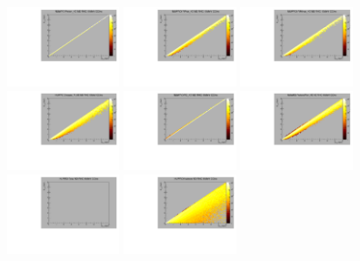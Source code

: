 \begin{center}

  \includegraphics[width=0.245\textwidth]{plots/response_matrix/Proton_KE_RHC_CCInc_10MeV.pdf}
  \includegraphics[width=0.245\textwidth]{plots/response_matrix/PiPlus_KE_RHC_CCInc_10MeV.pdf}
  \includegraphics[width=0.245\textwidth]{plots/response_matrix/PiMinus_KE_RHC_CCInc_10MeV.pdf}
  \includegraphics[width=0.245\textwidth]{plots/response_matrix/Charged_Pi_KE_RHC_CCInc_10MeV.pdf}
  \includegraphics[width=0.245\textwidth]{plots/response_matrix/Pi0_KE_RHC_CCInc_10MeV.pdf}
  \includegraphics[width=0.245\textwidth]{plots/response_matrix/Proton+Pion_KE_RHC_CCInc_10MeV.pdf}
  \includegraphics[width=0.245\textwidth]{plots/response_matrix/Total_RHC_CCInc_10MeV.pdf}
  \includegraphics[width=0.245\textwidth]{plots/response_matrix/Hadrons_RHC_CCInc_10MeV.pdf}

\end{center}

